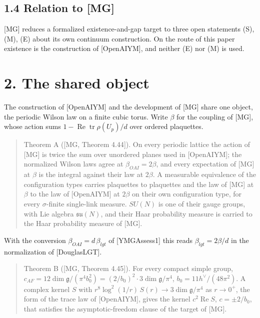 \documentclass[10pt,letterpaper,twocolumn]{article}
\providecommand{\rm}{}\DeclareOldFontCommand{\rm}{\normalfont\rmfamily}{\mathrm}
\begin{document}
\subsection{1.4 Relation to {[}MG{]}}\label{14-relation-to-mg}

{[}MG{]} reduces a formalized existence-and-gap target to three open statements (S), (M), (E) about its own continuum construction. On the route of this paper existence is the construction of {[}OpenAIYM{]}, and neither (E) nor (M) is used.

\section{2. The shared object}\label{2-the-shared-object}

The construction of {[}OpenAIYM{]} and the development of {[}MG{]} share one object, the periodic Wilson law on a finite cubic torus. Write \(\beta\) for the coupling of {[}MG{]}, whose action sums \(1-\operatorname{Re}\operatorname{tr}\rho(U_p)/d\) over ordered plaquettes.

\begin{quote}
Theorem A ({[}MG, Theorem 4.44{]}). On every periodic lattice the action of {[}MG{]} is twice the sum over unordered planes used in {[}OpenAIYM{]}; the normalized Wilson laws agree at \(\beta_{\rm OAI}=2\beta\), and every expectation of {[}MG{]} at \(\beta\) is the integral against their law at \(2\beta\). A measurable equivalence of the configuration types carries plaquettes to plaquettes and the law of {[}MG{]} at \(\beta\) to the law of {[}OpenAIYM{]} at \(2\beta\) on their own configuration type, for every \(\sigma\)-finite single-link measure. \(SU(N)\) is one of their gauge groups, with Lie algebra \(\mathfrak{su}(N)\), and their Haar probability measure is carried to the Haar probability measure of {[}MG{]}.
\end{quote}

With the conversion \(\beta_{\rm OAI}=d\,\beta_{\rm lgt}\) of {[}YMGAssess1{]} this reads \(\beta_{\rm lgt}=2\beta/d\) in the normalization of {[}DouglasLGT{]}.

\begin{quote}
Theorem B ({[}MG, Theorem 4.45{]}). For every compact simple group, \(c_{\rm AF}=12\dim\mathfrak g/(\pi^4b_0^2)=(2/b_0)^2\cdot3\dim\mathfrak g/\pi^4\), \(b_0=11h^\vee/(48\pi^2)\). A complex kernel \(S\) with \(r^8\log^2(1/r)\,S(r)\to3\dim\mathfrak g/\pi^4\) as \(r\to0^+\), the form of the trace law of {[}OpenAIYM{]}, gives the kernel \(c^2\operatorname{Re}S\), \(c=\pm2/b_0\), that satisfies the asymptotic-freedom clause of the target of {[}MG{]}.
\end{quote}
\end{document}
